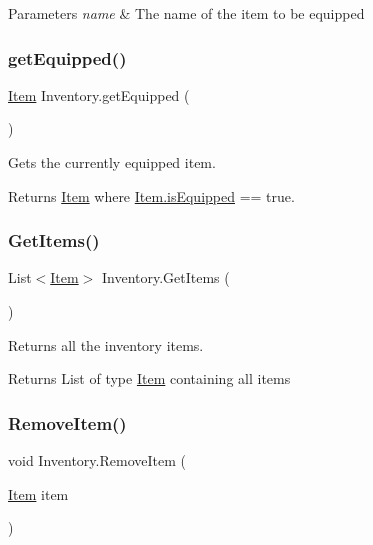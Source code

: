 \begin{DoxyParams}{Parameters}
{\em name} & The name of the item to be equipped\\
\hline
\end{DoxyParams}
\mbox{\label{class_inventory_adc1befc890a2f08843b92ca78ef02758}} 
\subsubsection{\texorpdfstring{getEquipped()}{getEquipped()}}
{\footnotesize\ttfamily \mbox{\hyperlink{class_item}{Item}} Inventory.\+get\+Equipped (\begin{DoxyParamCaption}{ }\end{DoxyParamCaption})}



Gets the currently equipped item. 

\begin{DoxyReturn}{Returns}
\mbox{\hyperlink{class_item}{Item}} where \mbox{\hyperlink{class_item_afad013640f1c29591ae9977169888fec}{Item.\+is\+Equipped}} == true.
\end{DoxyReturn}
\mbox{\label{class_inventory_a8b355dd7bd1fab5ca34729f1530db9ee}} 
\subsubsection{\texorpdfstring{GetItems()}{GetItems()}}
{\footnotesize\ttfamily List$<$\mbox{\hyperlink{class_item}{Item}}$>$ Inventory.\+Get\+Items (\begin{DoxyParamCaption}{ }\end{DoxyParamCaption})}



Returns all the inventory items. 

\begin{DoxyReturn}{Returns}
List of type \mbox{\hyperlink{class_item}{Item}} containing all items
\end{DoxyReturn}
\mbox{\label{class_inventory_a9ac6471939fdbe154c35eed678c6976b}} 
\subsubsection{\texorpdfstring{RemoveItem()}{RemoveItem()}}
{\footnotesize\ttfamily void Inventory.\+Remove\+Item (\begin{DoxyParamCaption}\item[{\mbox{\hyperlink{class_item}{Item}}}]{item }\end{DoxyParamCaption})}



